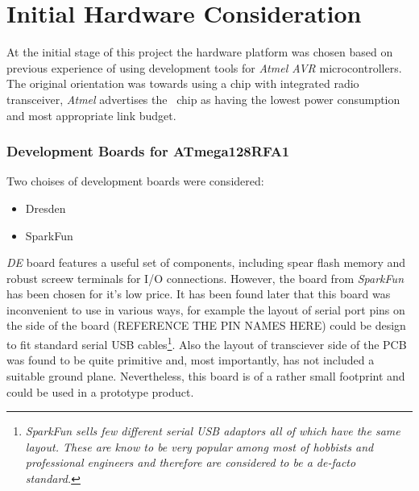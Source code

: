 \section{Initial Hardware Consideration}

  At the initial stage of this project the hardware platform was chosen
 based on previous experience of using development tools for \emph{Atmel
 AVR} microcontrollers. The original orientation was towards using a chip
 with integrated radio transceiver, \emph{Atmel} advertises the \RFA\ chip
 as having the lowest power consumption and most appropriate link budget.

\subsubsection{Development Boards for ATmega128RFA1}

  Two choises of development boards were considered:

	\begin{itemize}
		\item Dresden
		\item SparkFun
	\end{itemize}

  \emph{DE} board features a useful set of components, including spear flash
 memory and robust screew terminals for I/O connections. However, the board
 from \emph{SparkFun} has been chosen for it's low price.
  It has been found later that this board was inconvenient to use in various
 ways, for example the layout of serial port pins on the side of the board
 (REFERENCE THE PIN NAMES HERE) could be design to fit standard serial USB
 cables\footnote{\emph{SparkFun sells few different serial USB adaptors all
 of which have the same layout. These are know to be very popular among most
 of hobbists and professional engineers and therefore are considered to be
 a de-facto standard.}}. Also the layout of transciever side of the PCB was
 found to be quite primitive and, most importantly, has not included a
 suitable ground plane. Nevertheless, this board is of a rather small footprint
 and could be used in a prototype product.

